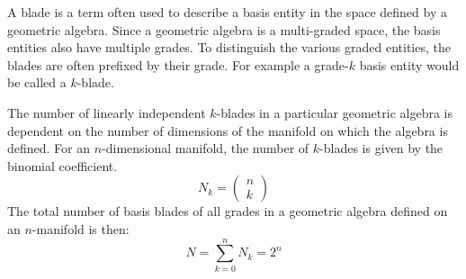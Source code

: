 \documentclass[12pt]{article}
\begin{document}
A blade is a term often used to describe a basis entity in the space defined by a geometric algebra.  Since a geometric algebra is a multi-graded space, the basis entities also have multiple grades.  To distinguish the various graded entities, the blades are often prefixed by their grade.  For example a grade-$k$ basis entity would be called a $k$-blade.

The number of linearly independent $k$-blades in a particular geometric algebra is dependent on the number of dimensions of the manifold on which the algebra is defined.  For an $n$-dimensional manifold, the number of $k$-blades is given by the binomial coefficient.
\[
N_k = \left( \begin{array}{c}
n \\
k
\end{array} \right)
\]
The total number of basis blades of all grades in a geometric algebra defined on an $n$-manifold is then:
\[
N = \sum_{k=0}^n N_k = 2^n
\]

\end{document}
